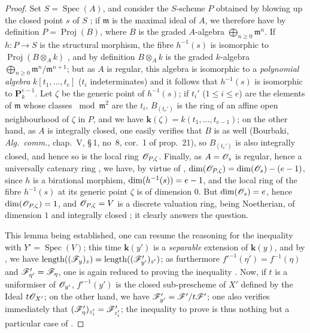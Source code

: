 \begin{proof}
Set $S=\operatorname{Spec}(A)$, and consider the $S$-scheme $P$ obtained by blowing up the closed point $s$ of $S$ ; if $\mathfrak{m}$ is the maximal ideal of $A$, we therefore have by definition $P=\operatorname{Proj}(B)$, where $B$ is the graded $A$-algebra $\bigoplus_{n\geqslant 0}\mathfrak{m}^n$.
If $h:P\to S$ is the structural morphism, the fibre $h^{-1}(s)$ is isomorphic to $\operatorname{Proj}(B\otimes_A k)$ , and by definition $B\otimes_A k$ is the graded $k$-algebra $\bigoplus_{n\geqslant 0}\mathfrak{m}^n/\mathfrak{m}^{n+1}$; but as $A$ is regular, this algebra is isomorphic to a \emph{polynomial algebra} $k[t_1,\ldots,t_e]$ ($t_i$ indeterminates)  and it follows that $h^{-1}(s)$ is isomorphic to $\mathbf{P}_k^{e-1}$.
Let $\zeta$ be the generic point of $h^{-1}(s)$; if $t_i'$ ($1\leqslant i\leqslant e$) are the elements of $\mathfrak{m}$ whose classes $\bmod\mathfrak{m}^2$ are the $t_i$, $B_{(t_e')}$ is the ring of an affine open neighbourhood of $\zeta$ in $P$, and we have $\boldsymbol{k}(\zeta)=k(t_1,\ldots,t_{e-1})$; on the other hand, as $A$ is integrally closed, one easily verifies that $B$ is as well (Bourbaki, \emph{Alg.\ comm.}, chap.~V, \S\,1, no~8, cor.~1 of prop.~21), so $B_{(t_e')}$ is also integrally closed, and hence so is the local ring $\mathscr{O}_{P,\zeta}$.
Finally, as $A=\mathscr{O}_s$ is regular, hence a universally catenary ring , we have, by virtue of , $\dim(\mathscr{O}_{P,\zeta})=\dim(\mathscr{O}_s)-(e- 1)$, since $h$ is a birational morphism, $\dim(h^{-1}(s))=e- 1$, and the local ring of the fibre $h^{-1}(s)$ at its generic point $\zeta$ is of dimension $0$.
But $\dim(\mathscr{O}_s)=e$, hence $\dim(\mathscr{O}_{P,\zeta})=1$, and $\mathscr{O}_{P,\zeta}=V$ is a discrete valuation ring, being Noetherian, of dimension $1$ and integrally closed ; it clearly answers the question.

This lemma being established, one can resume the reasoning for the inequality  with $Y'=\operatorname{Spec}(V)$; this time $\boldsymbol{k}(y')$ is a \emph{separable} extension of $\boldsymbol{k}(y)$, and by , we have $\operatorname{length}((\mathscr{F}_y)_z)=\operatorname{length}((\mathscr{F}_{y'}')_{z'})$; as furthermore $f'^{-1}(\eta')=f^{-1}(\eta)$ and $\mathscr{F}_{\eta'}'=\mathscr{F}_\eta$, one is again reduced to proving the inequality .
Now, if $t$ is a uniformiser of $\mathscr{O}_{y'}$, $f'^{-1}(y')$ is the closed sub-prescheme of $X'$ defined by the Ideal $t\mathscr{O}_{X'}$; on the other hand, we have $\mathscr{F}_{y'}'=\mathscr{F}'/t\mathscr{F}'$; one also verifies immediately  that $(\mathscr{F}_\eta')_{z_i'}=\mathscr{F}_{z_i'}'$; the inequality to prove  is thus nothing but a particular case of .
\end{proof}

